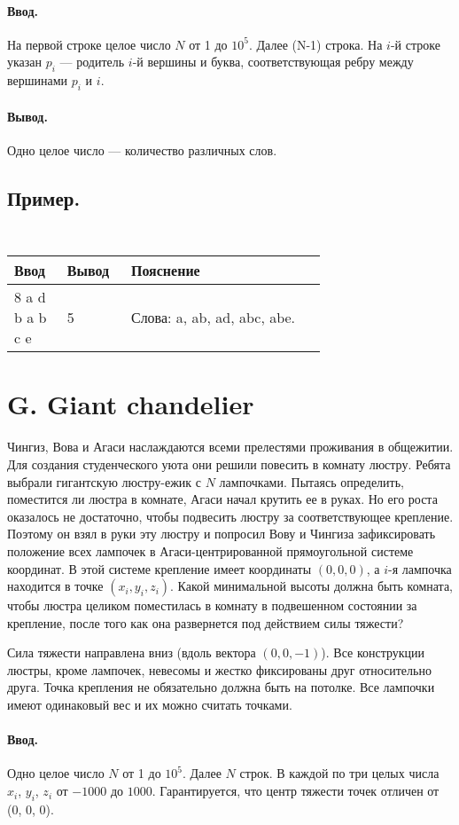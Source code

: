 \documentclass[12pt, a5paper]{article}
\newcommand{\informat}[1]
{
	\paragraph{Ввод.\\} #1
}
\newcommand{\outformat}[1]
{
	\paragraph{Вывод.\\} #1
}
\newcommand{\examplepic}[3]
{
	\subsection*{Пример.}
	{\tt
	\noindent
	\begin{tabular}{|p{0.1\linewidth}|p{0.1\linewidth}|p{0.5\linewidth}|}
	\hline
	Ввод 	& Вывод  	& Пояснение\\
	\hline
	#1 		& #2 		& #3\\
	\hline
	\end{tabular}
	}
}
\begin{document}
\informat{На первой строке целое число $N$ от 1 до $10^5$. Далее (N-1) строка. На $i$-й строке указан $p_i$ --- родитель $i$-й вершины и буква, соответствующая ребру между вершинами $p_i$ и $i$.}


\outformat{Одно целое число --- количество различных слов.}

\examplepic{
8 \newline
1 a \newline
5 d \newline
5 b \newline
1 a \newline
2 b \newline
6 c \newline
4 e
}{5}{Слова: a, ab, ad, abc, abe. \newline 
}





\section*{G. Giant chandelier}
 

Чингиз, Вова и Агаси наслаждаются всеми прелестями проживания в общежитии. Для создания студенческого уюта они решили повесить в комнату люстру. Ребята выбрали гигантскую люстру-ежик с $N$ лампочками. Пытаясь определить, поместится ли люстра в комнате, Агаси начал крутить ее в руках. Но его роста оказалось не достаточно, чтобы подвесить люстру за соответствующее крепление. Поэтому он взял в руки эту люстру и попросил Вову и Чингиза зафиксировать положение всех лампочек в Агаси-центрированной прямоугольной системе координат. В этой системе крепление имеет координаты $(0, 0, 0)$, а $i$-я лампочка находится в точке $(x_i, y_i, z_i)$. Какой минимальной высоты должна быть комната, чтобы люстра целиком поместилась в комнату в подвешенном состоянии за крепление, после того как она развернется под действием силы тяжести?

Сила тяжести направлена вниз (вдоль вектора $(0, 0, -1)$). Все конструкции люстры, кроме лампочек, невесомы и жестко фиксированы друг относительно друга. Точка крепления не обязательно должна быть на потолке. Все лампочки имеют одинаковый вес и их можно считать точками. 

\informat{Одно целое число $N$ от 1 до $10^5$. Далее $N$ строк. В каждой по три целых числа $x_i$, $y_i$, $z_i$ от $-1000$ до $1000$. Гарантируется, что центр тяжести точек отличен от (0, 0, 0).}
\end{document}
